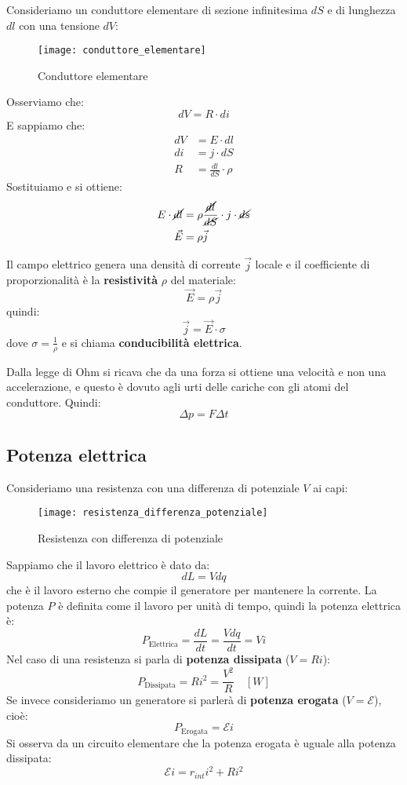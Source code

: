 \documentclass[a4paper]{article}
\begin{document}
\vspace{1em}
\noindent
Consideriamo un conduttore elementare di sezione infinitesima \( dS \) e di lunghezza
\( dl \) con una tensione \( dV \):
\begin{figure}[H]
  \centering
  \texttt{[image: conduttore\_elementare]}
  \caption{Conduttore elementare}
\end{figure}
\noindent
Osserviamo che:
\[
  dV = R \cdot di
\] 
E sappiamo che:
\[
  \begin{aligned}
    dV &= E \cdot dl \\
    di &= j \cdot dS \\
    R &= \frac{dl}{dS} \cdot \rho
  \end{aligned}
\] 
Sostituiamo e si ottiene:
\[
  \begin{aligned}
    E \cdot \cancel{dl} &= \rho \frac{\cancel{dl}}{\cancel{dS}} \cdot j \cdot \cancel{ds}\\
    \vec{E} &= \rho \vec{j}
  \end{aligned}
\] 
\begin{definition}
  Il campo elettrico genera una densità di corrente \( \vec{j} \) locale e il coefficiente
  di proporzionalità è la \textbf{resistività} \( \rho \) del materiale:
  \[
    \vec{E} = \rho \vec{j}
  \] 
  quindi:
  \[
    \vec{j} = \vec{E} \cdot \sigma
  \] 
  dove \( \sigma = \frac{1}{\rho} \) e si chiama \textbf{conducibilità elettrica}.
\end{definition}
Dalla legge di Ohm si ricava che da una forza si ottiene una velocità e non una accelerazione,
e questo è dovuto agli urti delle cariche con gli atomi del conduttore. Quindi:
\[
  \Delta p = F \Delta t
\] 

\subsection{Potenza elettrica}
Consideriamo una resistenza con una differenza di potenziale \( V \) ai capi:
\begin{figure}[H]
  \centering
  \texttt{[image: resistenza\_differenza\_potenziale]}
  \caption{Resistenza con differenza di potenziale}
\end{figure}
\noindent
Sappiamo che il lavoro elettrico è dato da:
\[
  dL = V dq
\] 
che è il lavoro esterno che compie il generatore per mantenere la corrente.
La potenza \( P \) è definita come il lavoro per unità di tempo, quindi la potenza
elettrica è:
\[
  P_{\text{Elettrica}} = \frac{dL}{dt} = \frac{V dq}{dt} = V i
\] 
Nel caso di una resistenza si parla di \textbf{potenza dissipata} (\( V = Ri \)):
\[
  P_{\text{Dissipata}} = R i^2 = \frac{V^2}{R} \quad \left[ W \right]
\] 
Se invece consideriamo un generatore si parlerà di \textbf{potenza erogata} 
(\( V = \mathcal{E} \)), cioè:
\[
  P_{\text{Erogata}} = \mathcal{E} i
\] 
Si osserva da un circuito elementare che la potenza erogata è uguale alla potenza dissipata:
\[
  \mathcal{E}i = r_{int} i^2 + Ri^2
\] 
\end{document}
